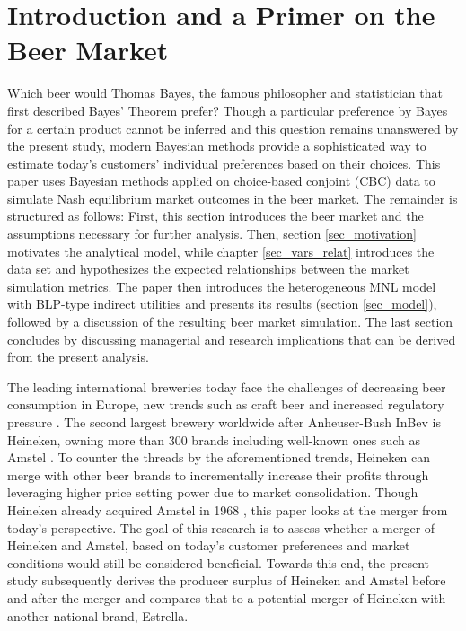 \documentclass[12pt,a4paper]{article}
\begin{document}
\section{Introduction and a Primer on the Beer Market} \label{sec_intro}
Which beer would Thomas Bayes, the famous philosopher and statistician that first described Bayes' Theorem \citep{bayesEssaySolvingProblem1763} prefer?
Though a particular preference by Bayes for a certain product cannot be inferred and this question remains unanswered by the present study, modern Bayesian methods provide a sophisticated way to estimate today's customers' individual preferences based on their choices.
This paper uses Bayesian methods applied on choice-based conjoint (CBC) data to simulate Nash equilibrium market outcomes in the beer market.
The remainder is structured as follows: First, this section introduces the beer market and the assumptions necessary for further analysis.
Then, section \ref{sec_motivation} motivates the analytical model, while chapter \ref{sec_vars_relat} introduces the data set and hypothesizes the expected relationships between the market simulation metrics.
The paper then introduces the heterogeneous MNL model with BLP-type indirect utilities and presents its results (section \ref{sec_model}), followed by a discussion of the resulting beer market simulation.
The last section concludes by discussing managerial and research implications that can be derived from the present analysis.

The leading international breweries today face the challenges of decreasing beer consumption in Europe, new trends such as craft beer and increased regulatory pressure \citep{jpmorganWhatTapGlobal2018}.
The second largest brewery worldwide after Anheuser-Bush InBev is Heineken, owning more than 300 brands including well-known ones such as Amstel \citep{heinekenHeinekenAnnualReport2019}.
To counter the threads by the aforementioned trends, Heineken can merge with other beer brands to incrementally increase their profits through leveraging higher price setting power due to market consolidation.
Though Heineken already acquired Amstel in 1968 \citep[p. 49]{oliverOxfordCompanionBeer2011}, this paper looks at the merger from today's perspective.
The goal of this research is to assess whether a merger of Heineken and Amstel, based on today's customer preferences and market conditions would still be considered beneficial.
Towards this end, the present study subsequently derives the producer surplus of Heineken and Amstel before and after the merger and compares that to a potential merger of Heineken with another national brand, Estrella.
\end{document}
